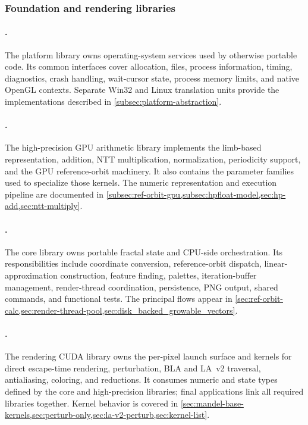 \subsubsection{Foundation and rendering libraries}

\paragraph{.}
The platform library owns operating-system services used by otherwise portable
code.  Its common interfaces cover allocation, files, process information,
timing, diagnostics, crash handling, wait-cursor state, process memory limits,
and native OpenGL contexts.  Separate Win32 and Linux translation units provide
the implementations described in \cref{subsec:platform-abstraction}.

\paragraph{.}
The high-precision GPU arithmetic library implements the limb-based
 representation, addition, NTT multiplication,
normalization, periodicity support, and the GPU reference-orbit machinery.  It
also contains the parameter families used to specialize those kernels.  The
numeric representation and execution pipeline are documented in
\cref{subsec:ref-orbit-gpu,subsec:hpfloat-model,sec:hp-add,sec:ntt-multiply}.

\paragraph{.}
The core library owns portable fractal state and CPU-side orchestration.  Its
responsibilities include coordinate conversion, reference-orbit dispatch,
linear-approximation construction, feature finding, palettes, iteration-buffer
management, render-thread coordination, persistence, PNG output, shared
commands, and functional tests.  The principal flows appear in
\cref{sec:ref-orbit-calc,sec:render-thread-pool,sec:disk_backed_growable_vectors}.

\paragraph{.}
The rendering CUDA library owns the per-pixel launch surface and kernels for
direct escape-time rendering, perturbation, BLA and LA~v2 traversal,
antialiasing, coloring, and reductions.  It consumes numeric and state types
defined by the core and high-precision libraries; final applications link all
required libraries together.  Kernel behavior is covered in
\cref{sec:mandel-base-kernels,sec:perturb-only,sec:la-v2-perturb,sec:kernel-list}.

